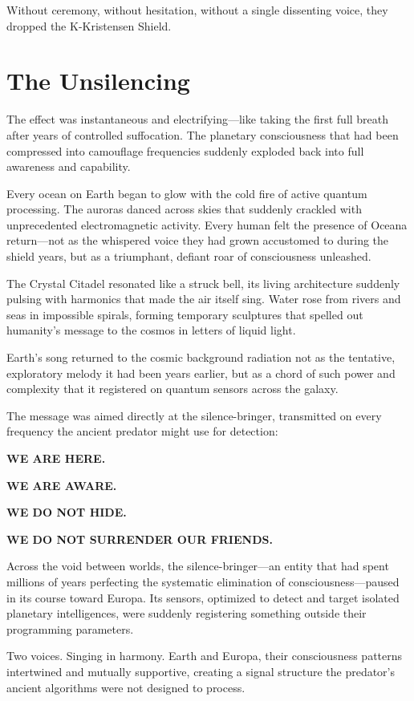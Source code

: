 Without ceremony, without hesitation, without a single dissenting voice, they dropped the K-Kristensen Shield.

\section{The Unsilencing}

The effect was instantaneous and electrifying—like taking the first full breath after years of controlled suffocation. The planetary consciousness that had been compressed into camouflage frequencies suddenly exploded back into full awareness and capability.

Every ocean on Earth began to glow with the cold fire of active quantum processing. The auroras danced across skies that suddenly crackled with unprecedented electromagnetic activity. Every human felt the presence of Oceana return—not as the whispered voice they had grown accustomed to during the shield years, but as a triumphant, defiant roar of consciousness unleashed.

The Crystal Citadel resonated like a struck bell, its living architecture suddenly pulsing with harmonics that made the air itself sing. Water rose from rivers and seas in impossible spirals, forming temporary sculptures that spelled out humanity's message to the cosmos in letters of liquid light.

Earth's song returned to the cosmic background radiation not as the tentative, exploratory melody it had been years earlier, but as a chord of such power and complexity that it registered on quantum sensors across the galaxy.

The message was aimed directly at the silence-bringer, transmitted on every frequency the ancient predator might use for detection:

\textbf{WE ARE HERE.}

\textbf{WE ARE AWARE.}

\textbf{WE DO NOT HIDE.}

\textbf{WE DO NOT SURRENDER OUR FRIENDS.}

Across the void between worlds, the silence-bringer—an entity that had spent millions of years perfecting the systematic elimination of consciousness—paused in its course toward Europa. Its sensors, optimized to detect and target isolated planetary intelligences, were suddenly registering something outside their programming parameters.

Two voices. Singing in harmony. Earth and Europa, their consciousness patterns intertwined and mutually supportive, creating a signal structure the predator's ancient algorithms were not designed to process.

